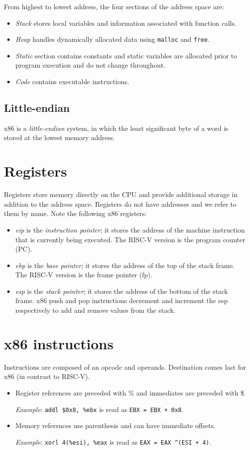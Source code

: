 \bigskip
From highest to lowest address, the four sections of the address space are:
\begin{itemize}
    \item \emph{Stack} stores local variables and information associated with function calls.
    \item \emph{Heap} handles dynamically allocated data using \texttt{malloc} and \texttt{free}.
    \item \emph{Static} section contains constants and static variables are allocated prior to program execution and do not change throughout.
    \item \emph{Code} contains executable instructions.
\end{itemize}

\subsection{Little-endian}
x86 is a \emph{little-endian} system, in which the least significant byte of a word is stored at the lowest memory address.

\section{Registers}
Registers store memory directly on the CPU and provide additional storage in addition to the address space. Registers do not have addresses and we refer to them by name. Note the following x86 registers:
\begin{itemize}
    \item \emph{eip} is the \emph{instruction pointer}; it stores the address of the machine instruction that is currently being executed. The RISC-V version is the program counter (PC).
    \item \emph{ebp} is the \emph{base pointer}; it stores the address of the top of the stack frame. The RISC-V version is the frame pointer (fp).
    \item \emph{esp} is the \emph{stack pointer}; it stores the address of the bottom of the stack frame. x86 push and pop instructions decrement and increment the esp respectively to add and remove values from the stack.
\end{itemize}

\section{x86 instructions}
Instructions are composed of an opcode and operands. Destination comes last for x86 (in contrast to RISC-V).
\begin{itemize}
    \item Register references are preceded with \% and immediates are preceded with \$. 
    
    \emph{Example}: \texttt{addl \$0x8, \%ebx} is read as \texttt{EBX = EBX + 0x8}.
    
    \item Memory references use parenthesis and can have immediate offsets.

    \emph{Example}: \texttt{xorl 4(\%esi), \%eax} is read as \texttt{EAX = EAX \^ \*(ESI + 4)}.
\end{itemize}

